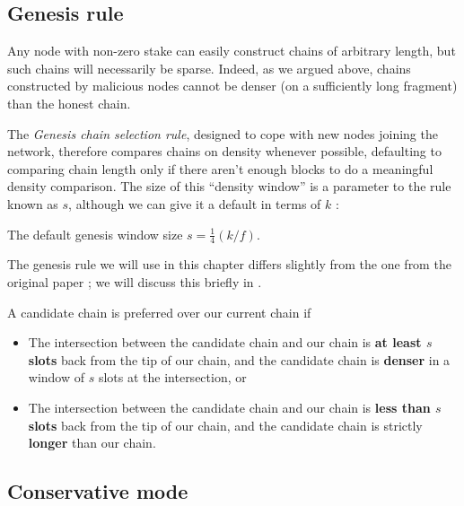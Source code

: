 \subsection{Genesis rule}

Any node with non-zero stake can easily construct chains of arbitrary length,
but such chains will necessarily be sparse. Indeed, as we argued above,
chains constructed by malicious nodes cannot be denser (on a sufficiently
long fragment) than the honest chain.

The \emph{Genesis chain selection rule}, designed to cope with new nodes joining
the network, therefore compares chains on density whenever possible, defaulting
to comparing chain length only if there aren't enough blocks to do a meaningful
density comparison. The size of this ``density window'' is a parameter to the
rule known as $s$, although we can give it a default in terms of $k$
\cite{cryptoeprint:2018:378}:

\begin{definition}
The default genesis window size $s = \frac{1}{4}(k / f)$.
\end{definition}

The genesis rule we will use in this chapter differs slightly from the one from
the original paper \cite{cryptoeprint:2018:378}; we will discuss this briefly in
\cite{genesis:todo}.

\begin{definition}
\label{genesis:rule}
A candidate chain is preferred over our current chain if

\begin{itemize}
\item The intersection between the candidate chain and our chain is \textbf{at
least $s$ slots} back from the tip of our chain, and the candidate chain is
\textbf{denser} in a window of $s$ slots at the intersection, or

\item The intersection between the candidate chain and our chain is \textbf{less
than $s$ slots} back from the tip of our chain, and the candidate chain is
strictly \textbf{longer} than our chain.
\end{itemize}

\end{definition}

\subsection{Conservative mode}

